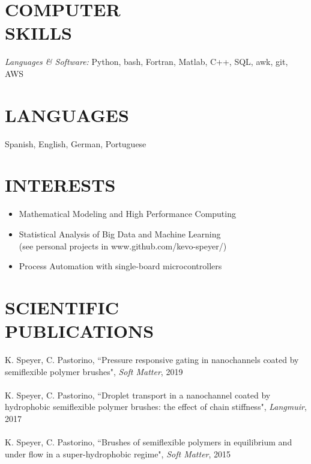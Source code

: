 \documentclass[margin]{res}
\begin{document}
\begin{resume}
 
\section{COMPUTER \\ SKILLS} {\sl Languages \& Software:} Python, bash, 
		Fortran, Matlab, C++, SQL, awk, git, AWS 
               
 
\section{LANGUAGES}  Spanish, English, German, Portuguese 

\section{INTERESTS}        
       \begin{itemize}  \itemsep -2pt %
        \item	Mathematical Modeling and High Performance Computing 
	\item   Statistical Analysis of Big Data and Machine Learning \\ 
	    	(see personal projects in www.github.com/kevo-speyer/) 
    	\item	Process Automation with single-board microcontrollers 
       \end{itemize}
 
\section{SCIENTIFIC \\ PUBLICATIONS}            
		       K. Speyer, C. Pastorino, ``Pressure responsive gating in 
		nanochannels coated by semiflexible polymer brushes", 
		       {\sl Soft Matter}, 2019 \\ \\
		       K. Speyer, C. Pastorino, ``Droplet transport in a 
		nanochannel coated by hydrophobic semiflexible polymer 
		       brushes: the effect of chain stiffness", {\sl Langmuir},
		       2017 \\ \\
	K. Speyer, C. Pastorino, ``Brushes of semiflexible polymers in 
		equilibrium and under flow in a super-hydrophobic regime", 
		       {\sl Soft Matter}, 2015 


\end{resume}
\end{document}
